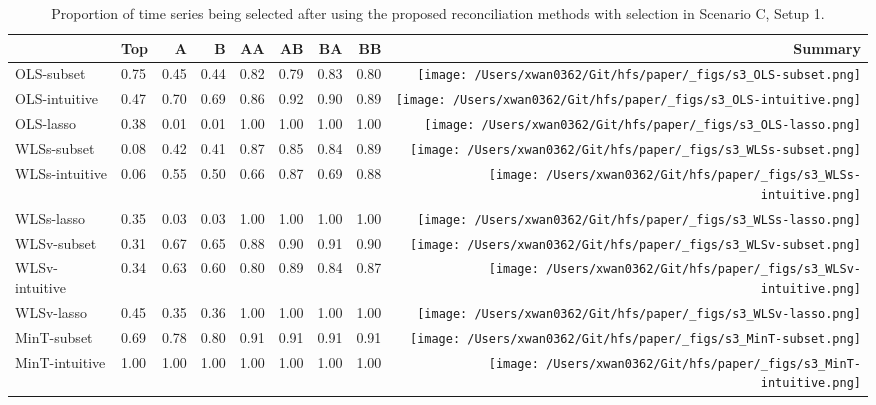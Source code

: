 \documentclass[
  11pt]{article}
\begin{document}
\hypertarget{tbl-s3-selection}{}
\begin{table}
\caption{\label{tbl-s3-selection}Proportion of time series being selected after using the proposed
reconciliation methods with selection in Scenario C, Setup 1. }\tabularnewline

\centering\begingroup\fontsize{11}{13}\selectfont

\begin{threeparttable}
\begin{tabular}{llrrrrrr>{}r}
\toprule
  & Top & A & B & AA & AB & BA & BB & Summary\\
\midrule
OLS-subset & 0.75 & 0.45 & 0.44 & 0.82 & 0.79 & 0.83 & 0.80 & \texttt{[image: /Users/xwan0362/Git/hfs/paper/\_figs/s3\_OLS-subset.png]}\\
OLS-intuitive & 0.47 & 0.70 & 0.69 & 0.86 & 0.92 & 0.90 & 0.89 & \texttt{[image: /Users/xwan0362/Git/hfs/paper/\_figs/s3\_OLS-intuitive.png]}\\
OLS-lasso & 0.38 & 0.01 & 0.01 & 1.00 & 1.00 & 1.00 & 1.00 & \texttt{[image: /Users/xwan0362/Git/hfs/paper/\_figs/s3\_OLS-lasso.png]}\\
\midrule
WLSs-subset & 0.08 & 0.42 & 0.41 & 0.87 & 0.85 & 0.84 & 0.89 & \texttt{[image: /Users/xwan0362/Git/hfs/paper/\_figs/s3\_WLSs-subset.png]}\\
WLSs-intuitive & 0.06 & 0.55 & 0.50 & 0.66 & 0.87 & 0.69 & 0.88 & \texttt{[image: /Users/xwan0362/Git/hfs/paper/\_figs/s3\_WLSs-intuitive.png]}\\
WLSs-lasso & 0.35 & 0.03 & 0.03 & 1.00 & 1.00 & 1.00 & 1.00 & \texttt{[image: /Users/xwan0362/Git/hfs/paper/\_figs/s3\_WLSs-lasso.png]}\\
\midrule
WLSv-subset & 0.31 & 0.67 & 0.65 & 0.88 & 0.90 & 0.91 & 0.90 & \texttt{[image: /Users/xwan0362/Git/hfs/paper/\_figs/s3\_WLSv-subset.png]}\\
WLSv-intuitive & 0.34 & 0.63 & 0.60 & 0.80 & 0.89 & 0.84 & 0.87 & \texttt{[image: /Users/xwan0362/Git/hfs/paper/\_figs/s3\_WLSv-intuitive.png]}\\
WLSv-lasso & 0.45 & 0.35 & 0.36 & 1.00 & 1.00 & 1.00 & 1.00 & \texttt{[image: /Users/xwan0362/Git/hfs/paper/\_figs/s3\_WLSv-lasso.png]}\\
\midrule
MinT-subset & 0.69 & 0.78 & 0.80 & 0.91 & 0.91 & 0.91 & 0.91 & \texttt{[image: /Users/xwan0362/Git/hfs/paper/\_figs/s3\_MinT-subset.png]}\\
MinT-intuitive & 1.00 & 1.00 & 1.00 & 1.00 & 1.00 & 1.00 & 1.00 & \texttt{[image: /Users/xwan0362/Git/hfs/paper/\_figs/s3\_MinT-intuitive.png]}\\

\end{tabular}
\end{threeparttable}
\end{table}
\end{document}
